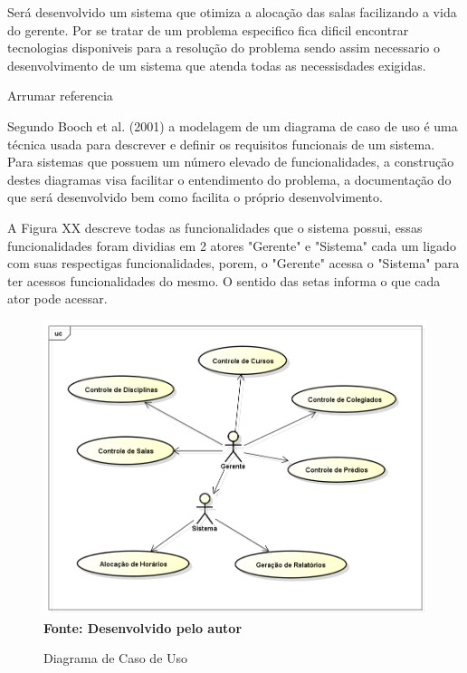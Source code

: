 \documentclass{abntpuc}
\begin{document}
%
%
%
%
%


Será desenvolvido um sistema que otimiza a alocação das salas facilizando a vida do gerente. Por se tratar de um problema especifico fica dificil encontrar tecnologias disponiveis para a resolução do problema sendo assim necessario o desenvolvimento de um sistema que atenda todas as necessisdades exigidas.



Arrumar referencia \par

Segundo Booch et al. (2001) a modelagem de um diagrama de caso de uso é uma técnica usada para descrever e definir os requisitos funcionais de um sistema. Para sistemas que possuem um número elevado de funcionalidades, a construção destes diagramas visa facilitar o entendimento do problema, a documentação do que será desenvolvido bem como facilita o próprio desenvolvimento.\par

A Figura XX descreve todas as funcionalidades que o sistema possui, essas funcionalidades foram dividias em 2 atores "Gerente" e "Sistema" cada um ligado com suas respectigas funcionalidades, porem, o "Gerente" acessa o "Sistema" para ter acessos funcionalidades do mesmo. O sentido das setas informa o que cada ator pode acessar.\par

\begin{figure}[!htb]
\caption[Diagrama de Caso de Uso]{Diagrama de Caso de Uso}
\label{fig:figura1}
\centering
\includegraphics[scale=0.5]{imagens/diagramaCasoUso.png}
\\ \textbf{\footnotesize Fonte: Desenvolvido pelo autor}
\end{figure}
\end{document}

